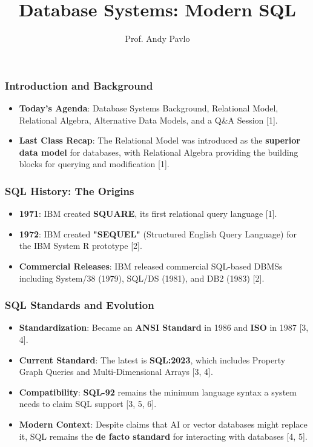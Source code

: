 \documentclass{beamer}
\title{\textbf{Database Systems: Modern SQL}}
\author{Prof. Andy Pavlo}
\institute{15-445/645 Fall 2024}
\date{}
\begin{document}
\frame{\titlepage}

\begin{frame}
\frametitle{Introduction and Background}
\begin{itemize}
    \item \textbf{Today's Agenda}: Database Systems Background, Relational Model, Relational Algebra, Alternative Data Models, and a Q\&A Session [1].
    \item \textbf{Last Class Recap}: The Relational Model was introduced as the \textbf{superior data model} for databases, with Relational Algebra providing the building blocks for querying and modification [1].
\end{itemize}
\end{frame}

\begin{frame}
\frametitle{SQL History: The Origins}
\begin{itemize}
    \item \textbf{1971}: IBM created \textbf{SQUARE}, its first relational query language [1].
    \item \textbf{1972}: IBM created \textbf{"SEQUEL"} (Structured English Query Language) for the IBM System R prototype [2].
    \item \textbf{Commercial Releases}: IBM released commercial SQL-based DBMSs including System/38 (1979), SQL/DS (1981), and DB2 (1983) [2].
\end{itemize}
\end{frame}

\begin{frame}
\frametitle{SQL Standards and Evolution}
\begin{itemize}
    \item \textbf{Standardization}: Became an \textbf{ANSI Standard} in 1986 and \textbf{ISO} in 1987 [3, 4].
    \item \textbf{Current Standard}: The latest is \textbf{SQL:2023}, which includes Property Graph Queries and Multi-Dimensional Arrays [3, 4].
    \item \textbf{Compatibility}: \textbf{SQL-92} remains the minimum language syntax a system needs to claim SQL support [3, 5, 6].
    \item \textbf{Modern Context}: Despite claims that AI or vector databases might replace it, SQL remains the \textbf{de facto standard} for interacting with databases [4, 5].
\end{itemize}
\end{frame}
\end{document}
